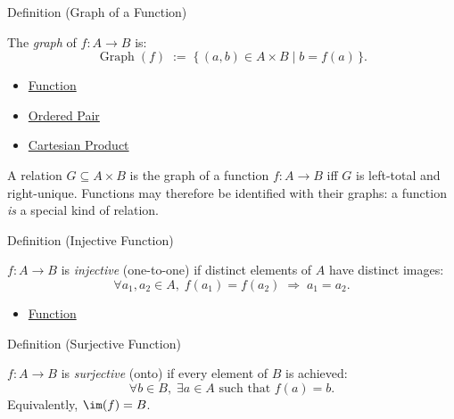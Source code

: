 \begin{definitionbox}{Definition (Graph of a Function)}
\begin{definition}\label{def:graph}
The \emph{graph} of $f : A \to B$ is:
\[
\operatorname{Graph}(f)
\;:=\;
\{\, (a,b) \in A \times B \mid b = f(a) \,\}.
\]
\end{definition}
\end{definitionbox}

\begin{dependencies}
\begin{itemize}
  \item \hyperref[def:function]{Function}
  \item \hyperref[def:ordered-pair]{Ordered Pair}
  \item \hyperref[def:cartesian-product]{Cartesian Product}
\end{itemize}
\end{dependencies}

\begin{remark*}
A relation $G \subseteq A \times B$ is the graph of a function $f : A \to B$
iff $G$ is left-total and right-unique. Functions may therefore be identified
with their graphs: a function \emph{is} a special kind of relation.
\end{remark*}

\begin{definitionbox}{Definition (Injective Function)}
\begin{definition}\label{def:injective}
$f : A \to B$ is \emph{injective} (one-to-one) if distinct elements of $A$
have distinct images:
\[
\forall a_1,a_2 \in A,\;
f(a_1)=f(a_2) \;\Longrightarrow\; a_1=a_2.
\]
\end{definition}
\end{definitionbox}

\begin{dependencies}
\begin{itemize}
  \item \hyperref[def:function]{Function}
\end{itemize}
\end{dependencies}

\begin{definitionbox}{Definition (Surjective Function)}
\begin{definition}\label{def:surjective}
$f : A \to B$ is \emph{surjective} (onto) if every element of $B$ is achieved:
\[
\forall b \in B,\; \exists a \in A \text{ such that } f(a)=b.
\]
Equivalently, $\im(f) = B$.
\end{definition}
\end{definitionbox}

